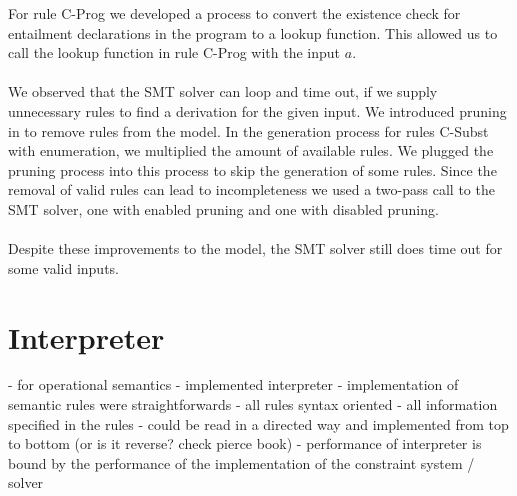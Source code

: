 For rule C-Prog we developed a process to convert the existence check for
entailment declarations in the program to a lookup function.
This allowed us to call the lookup function in rule C-Prog with the input $a$.\\
\\
We observed that the SMT solver can loop and time out,
if we supply unnecessary rules to find a derivation
for the given input.
We introduced pruning in  to
remove rules from the model.
In the generation process for rules C-Subst with enumeration,
we multiplied the amount of available rules.
We plugged the pruning process into this process
to skip the generation of some rules.
Since the removal of valid rules can lead to incompleteness
we used a two-pass call to the SMT solver,
one with enabled pruning and one with disabled pruning.\\
\\
Despite these improvements to the model,
the SMT solver still does time out
for some valid inputs.
%

\section{Interpreter}
- for operational semantics
  - implemented interpreter
  - implementation of semantic rules were straightforwards
  - all rules syntax oriented
  - all information specified in the rules
  - could be read in a directed way and implemented from top to bottom (or is it reverse? check pierce book)
  - performance of interpreter is bound by the performance of the implementation of the constraint system / solver

